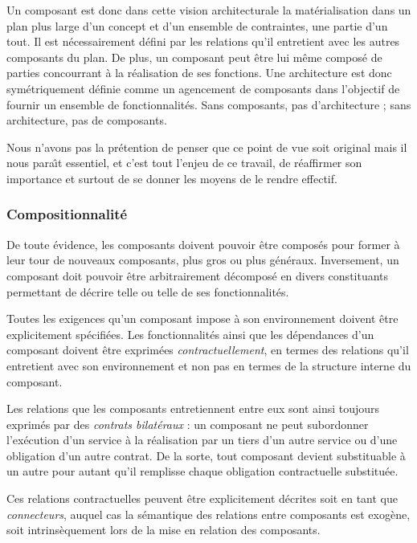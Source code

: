 Un composant est donc dans cette vision architecturale la
mat\'erialisation dans un plan plus large d'un concept et d'un
ensemble de contraintes, une partie d'un tout. Il  est 
n\'ecessairement d\'efini par les relations qu'il entretient avec
les autres composants du plan. De plus, un composant peut \^etre lui
m\^eme compos\'e de parties concourrant \`a la r\'ealisation de
ses fonctions. Une architecture est donc sym\'etriquement d\'efinie
comme un agencement de composants dans l'objectif de fournir un ensemble
de fonctionnalit\'es. Sans composants, pas d'architecture ; sans
architecture, pas de composants.

Nous n'avons pas la pr\'etention de penser que ce point
de vue soit original mais il nous para\^{\i}t essentiel, et c'est tout
l'enjeu de ce travail, de r\'eaffirmer son importance et surtout de
se donner les moyens de le rendre effectif.

\subsubsection{Compositionnalit\'e}

De toute \'evidence, les composants doivent pouvoir \^etre
compos\'es pour former \`a leur tour de nouveaux composants, plus
gros ou plus g\'en\'eraux. Inversement, un composant doit pouvoir
\^etre arbitrairement d\'ecompos\'e en divers constituants
permettant de d\'ecrire telle ou telle de ses fonctionnalit\'es. 

Toutes les exigences qu'un composant impose \`a son environnement
doivent \^etre explicitement sp\'ecifi\'ees. 
Les fonctionnalit\'es ainsi que les d\'ependances d'un composant doivent \^etre exprim\'ees
\emph{contractuellement}, en termes des relations qu'il entretient
avec son environnement et non pas en termes de la structure interne du composant.

Les relations que les composants entretiennent entre eux sont ainsi toujours
exprim\'es par des \emph{contrats bilat\'eraux} : un composant ne
peut subordonner l'ex\'ecution d'un service \`a la r\'ealisation
par un tiers d'un autre service ou d'une obligation d'un autre
contrat. De la sorte, tout composant devient substituable \`a un
autre pour autant qu'il remplisse chaque obligation contractuelle
substitu\'ee.

Ces relations contractuelles peuvent \^etre explicitement d\'ecrites
soit en tant que \emph{connecteurs}, auquel cas la s\'emantique des
relations entre composants est exog\`ene, soit intrins\`equement
lors de la mise en relation des composants. 

